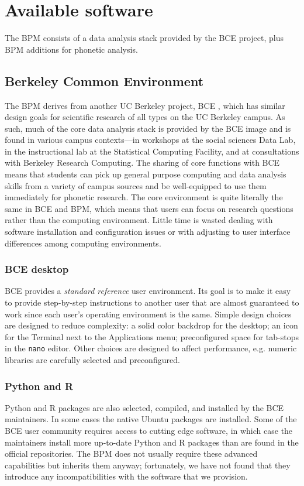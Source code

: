 \documentclass[a4paper]{article}
\begin{document}
  \section{Available software}
  The BPM consists of a data analysis stack provided by the BCE project, plus BPM additions for phonetic analysis.

    \subsection{Berkeley Common Environment}

    The BPM derives from another UC Berkeley project, BCE \cite{Clark14-BCE, BCE}, which has similar design goals for scientific research of all types on the UC Berkeley campus. As such, much of the core data analysis stack is provided by the BCE image and is found in various campus contexts---in workshops at the social sciences Data Lab, in the instructional lab at the Statistical Computing Facility, and at consultations with Berkeley Research Computing. The sharing of core functions with BCE means that students can pick up general purpose computing and data analysis skills from a variety of campus sources and be well-equipped to use them immediately for phonetic research. The core environment is quite literally the same in BCE and BPM, which means that users can focus on research questions rather than the computing environment. Little time is wasted dealing with software installation and configuration issues or with adjusting to user interface differences among computing environments.

    \subsubsection{BCE desktop}

    BCE provides a {\em standard reference} user environment. Its goal is to make it easy to provide step-by-step instructions to another user that are almost guaranteed to work since each user's operating environment is the same. Simple design choices are designed to reduce complexity: a solid color backdrop for the desktop; an icon for the Terminal next to the Applications menu; preconfigured space for tab-stops in the {\tt nano} editor. Other choices are designed to affect performance, e.g. numeric libraries are carefully selected and preconfigured.

    \subsubsection{Python and R}
    Python and R packages are also selected, compiled, and installed by the BCE maintainers. In some cases the native Ubuntu packages are installed. Some of the BCE user community requires access to cutting edge software, in which case the maintainers install more up-to-date Python and R packages than are found in the official repositories. The BPM does not usually require these advanced capabilities but inherits them anyway; fortunately, we have not found that they introduce any incompatibilities with the software that we provision.
  
\end{document}
